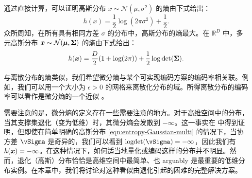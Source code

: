 \documentclass[../../book-main_zh.tex]{subfiles}
\begin{document}
\begin{example}[高斯分布的熵]
	通过直接计算，可以证明高斯分布 $x \sim \mathcal{N}(\mu, \sigma^2)$ 的熵由下式给出：
	\begin{equation}
		h(x) = \frac{1}{2}\log (2\pi \sigma^2) + \frac{1}{2}.
		\label{eqn:entropy-Gaussian}
	\end{equation}
	众所周知，在所有具有相同方差 $\sigma$ 的分布中，高斯分布的熵最大。在 $\mathbb{R}^D$ 中，多元高斯分布 $\bm{x} \sim \mathcal{N}(\boldsymbol{\mu}, \boldsymbol{\Sigma})$ 的熵由下式给出：
	\begin{equation}
		h(\bm{x}) = \frac{D}{2}(1 + \log(2\pi)) + \frac{1}{2}\log\det(\boldsymbol{\Sigma}).
		\label{eqn:entropy-Gaussian-multi}
	\end{equation}
\end{example}

与离散分布的熵类似，我们希望微分熵与某个可实现编码方案的编码率相关联。例如，我们可以用一个大小为 $\epsilon >0$ 的网格来离散化分布的域。所得离散分布的编码率可以看作是微分熵的一个近似 \cite{Cover-Thomas}。


需要注意的是，微分熵的定义存在一些需要注意的地方。对于高维空间中的分布，当其支撑集退化（变为低维）时，其微分熵会发散到 \(-\infty\)。这一事实在  中得到证明，但即使在简单明确的高斯分布 \eqref{eqn:entropy-Gaussian-multi} 的情况下，当协方差 \(\vSigma\) 是奇异的，我们可以看到 \(\logdet(\vSigma) = -\infty\)，因此我们有 $h(\bm{x}) = -\infty$。在这种情况下，如何适当地量化或编码这样的分布并不明显。然而，退化（高斯）分布恰恰是高维空间中最简单、也 arguably 是最重要的低维分布实例。在本章中，我们将讨论对这种看似由退化引起的困难的完整解决方案。


\end{document}
